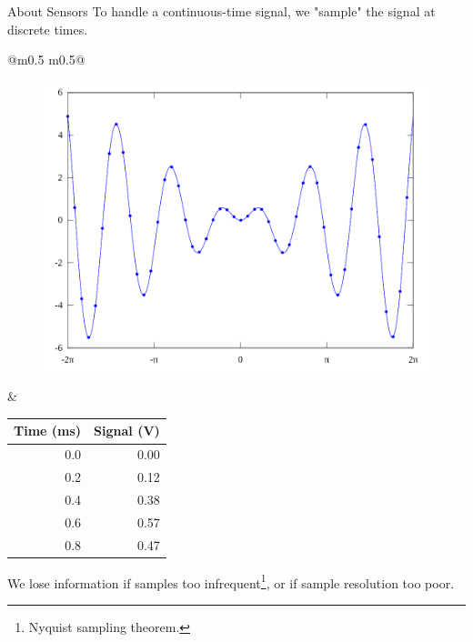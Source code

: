 \documentclass[aspectratio=169]{beamer}
\begin{document}
\begin{frame}[fragile]{About Sensors}
\small To handle a continuous-time signal, we "sample" the signal at discrete times.	\\
\begin{tabular}{@{}m{} m{}@{}}
\begin{figure}
\includegraphics[height=0.65\textheight,keepaspectratio]{img/sine-points.png}
\end{figure}

&

\centering
\begin{tabular}{r|r}
Time (ms) & Signal (V) \\ \hline
0.0 & 0.00 \\
0.2 & 0.12 \\
0.4 & 0.38 \\
0.6 & 0.57 \\
0.8 & 0.47 \\
\end{tabular}
\end{tabular}
We lose information if samples too infrequent\footnote{Nyquist sampling theorem.}, or if sample resolution too poor. \\
\vspace{1em}
\end{frame}
\end{document}
